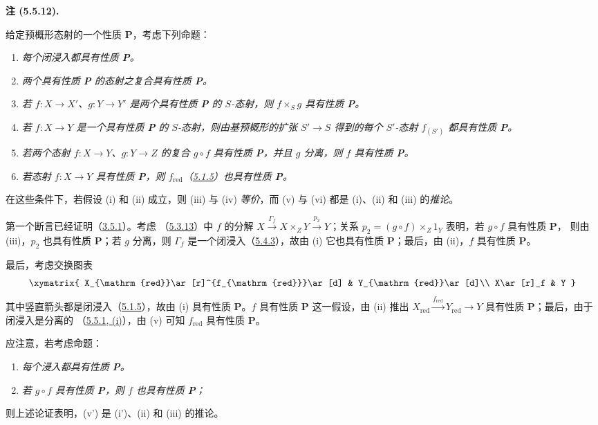 \documentclass[UTF8,fontset=none,11pt,oneside,openany]{ctexbook}
\newenvironment{remark}[1][]{%
  \par\medskip\noindent\textbf{注 (#1).}\ %
}{\par}
\newcommand{\oldpage}[2][]{%
  \hypertarget{ega-source-page-#1-#2}{}%
  \marginnote{\scriptsize\textbf{#1}~|~#2}\ignorespaces}
\let\EGAOriginalLabel\label
\renewcommand{\label}[1]{\phantomsection\EGAOriginalLabel{#1}}
\begin{document}
\begin{remark}[5.5.12]
\label{I.5.5.12-fr}
\normalfont 给定预概形态射的一个性质 \textbf{P}，考虑下列命题：
\begin{enumerate}
  \item[\rm(i)] \emph{每个闭浸入都具有性质 \textbf{P}。}
  \item[\rm(ii)] \emph{两个具有性质 \textbf{P} 的态射之复合具有性质
    \textbf{P}。}
  \item[\rm(iii)] \emph{若 $f:X\to X'$、$g:Y\to Y'$ 是两个具有性质
    \textbf{P} 的 $S$-态射，则 $f\times_S g$ 具有性质 \textbf{P}。}

\oldpage[I]{140}
  \item[\rm(iv)] \emph{若 $f:X\to Y$ 是一个具有性质 \textbf{P} 的
    $S$-态射，则由基预概形的扩张 $S'\to S$ 得到的每个 $S'$-态射
    $f_{(S')}$ 都具有性质 \textbf{P}。}
  \item[\rm(v)] \emph{若两个态射 $f:X\to Y$、$g:Y\to Z$ 的复合
    $g\circ f$ 具有性质 \textbf{P}，并且 $g$ 分离，则 $f$ 具有性质
    \textbf{P}。}
  \item[\rm(vi)] \emph{若态射 $f:X\to Y$ 具有性质 \textbf{P}，则
    $f_{\mathrm{red}}$（\hyperref[I.5.1.5-fr]{5.1.5}）也具有性质
    \textbf{P}。}
\end{enumerate}

在这些条件下，若假设 (i) 和 (ii) 成立，则 (iii) 与 (iv)
\emph{等价}，而 (v) 与 (vi) 都是 (i)、(ii) 和 (iii) 的\emph{推论}。

第一个断言已经证明（\hyperref[I.3.5.1-fr]{3.5.1}）。考虑
（\hyperref[I.5.3.13-fr]{5.3.13}）中 $f$ 的分解
$X\xrightarrow{\Gamma_f}X\times_Z Y\xrightarrow{p_2}Y$；关系
$p_2=(g\circ f)\times_Z 1_Y$ 表明，若 $g\circ f$ 具有性质 \textbf{P}，
则由 (iii)，$p_2$ 也具有性质 \textbf{P}；若 $g$ 分离，则
$\Gamma_f$ 是一个闭浸入（\hyperref[I.5.4.3-fr]{5.4.3}），故由 (i)
它也具有性质 \textbf{P}；最后，由 (ii)，$f$ 具有性质 \textbf{P}。

最后，考虑交换图表
\[
  \xymatrix{
    X_{\mathrm{red}}\ar[r]^{f_{\mathrm{red}}}\ar[d] &
    Y_{\mathrm{red}}\ar[d]\\
    X\ar[r]_f &
    Y
  }
\]
其中竖直箭头都是闭浸入（\hyperref[I.5.1.5-fr]{5.1.5}），故由 (i)
具有性质 \textbf{P}。$f$ 具有性质 \textbf{P} 这一假设，由 (ii) 推出
$X_{\mathrm{red}}\xrightarrow{f_{\mathrm{red}}}Y_{\mathrm{red}}\to Y$
具有性质 \textbf{P}；最后，由于闭浸入是分离的
（\hyperref[I.5.5.1-fr]{5.5.1, (i)}），由 (v) 可知
$f_{\mathrm{red}}$ 具有性质 \textbf{P}。

应注意，若考虑命题：
\begin{enumerate}
  \item[\rm(i')] \emph{每个浸入都具有性质 \textbf{P}。}
  \item[\rm(v')] \emph{若 $g\circ f$ 具有性质 \textbf{P}，则 $f$
    也具有性质 \textbf{P}；}
\end{enumerate}
则上述论证表明，(v') 是 (i')、(ii) 和 (iii) 的推论。
\end{remark}
\end{document}
